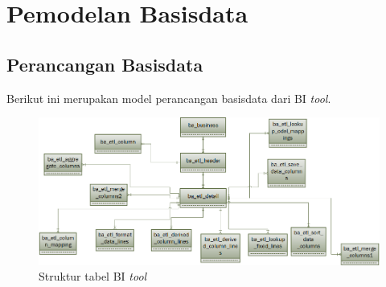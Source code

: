 \section{Pemodelan Basisdata}
\subsection{Perancangan Basisdata}
Berikut ini merupakan model perancangan basisdata dari BI \textit{tool}.

\begin{figure}[H]
	\centering
	\includegraphics[scale=0.6]{Gambar/Pemodelan-Basisdata}
	\caption{Struktur tabel BI \textit{tool}}
	\end{figure}

